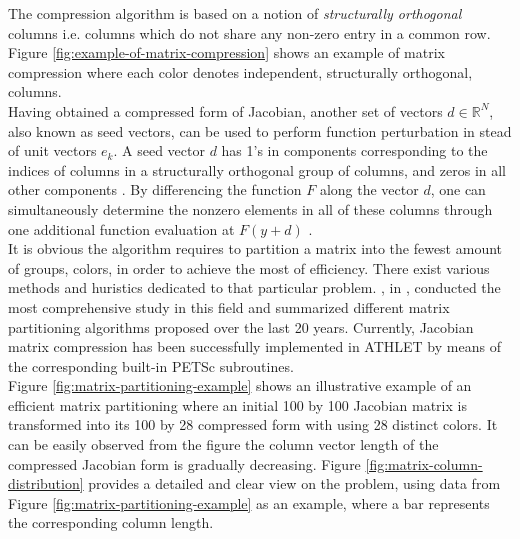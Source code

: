 The compression algorithm is based on a notion of \textit{structurally orthogonal} columns i.e. columns which do not share any non-zero entry in a common row. Figure \ref{fig:example-of-matrix-compression} shows an example of matrix compression where each color denotes independent, structurally orthogonal, columns.\\




Having obtained a compressed form of Jacobian, another set of vectors $d \in \mathbb{R}^{N}$, also known as seed vectors, can be used to perform function perturbation in stead of unit vectors $e_{k}$. A seed vector $d$ has 1’s in components corresponding to the indices of columns in a structurally orthogonal group of columns, and zeros in all other components \cite{gebremedhin2005color}. By differencing the function $F$ along the vector $d$, one can simultaneously determine the nonzero elements in all of these columns through one additional function evaluation at $F(y+d)$ \cite{gebremedhin2005color}.\\


It is obvious the algorithm requires to partition a matrix into the fewest amount of groups, colors, in order to achieve the most of efficiency. There exist various methods and huristics dedicated to that particular problem. \citeauthor{gebremedhin2005color}, in \cite{gebremedhin2005color}, conducted the most comprehensive study in this field and summarized different matrix partitioning algorithms proposed over the last 20 years. Currently, Jacobian matrix compression has been successfully implemented in ATHLET by means of the corresponding built-in PETSc subroutines.\\


Figure \ref{fig:matrix-partitioning-example} shows an illustrative example of an efficient matrix partitioning where an initial 100 by 100 Jacobian matrix is transformed into its 100 by 28 compressed form with using 28 distinct colors. It can be easily observed from the figure the column vector length of the compressed Jacobian form is gradually decreasing. Figure \ref{fig:matrix-column-distribution} provides a detailed and clear view on the problem, using data from Figure \ref{fig:matrix-partitioning-example} as an example, where a bar represents  the corresponding column length.\\


